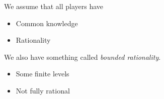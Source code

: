\begin{prev}
	We assume that all players have
	\begin{itemize}
		\item Common knowledge
		\item Rationality
	\end{itemize}
\end{prev}

\begin{note}
	We also have something called \emph{bounded rationality}.
	\begin{itemize}
		\item Some finite levels
		\item Not fully rational
	\end{itemize}
\end{note}

